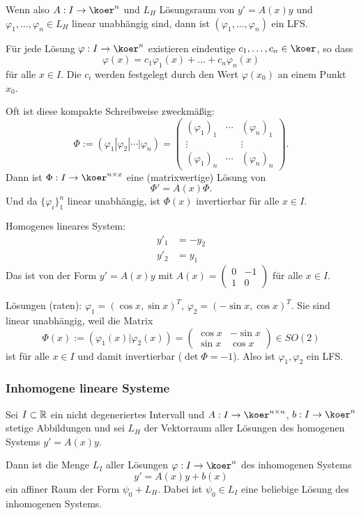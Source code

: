Wenn also $A:I \to \koer^n$ und $L_H$ Lösungsraum von $y' = A(x) y$ und
$\varphi_1, \ldots, \varphi_n \in L_H$ linear unabhängig sind, dann ist
$(\varphi_1, \ldots, \varphi_n)$ ein LFS.

Für jede Lösung $\varphi: I \to \koer^n$ existieren eindeutige $c_1, \ldots, c_n
\in \koer$, so dass
\[ \varphi(x) = c_1 \varphi_1(x) + \ldots + c_n \varphi_n(x) \]
für alle $x \in I$. Die $c_i$ werden festgelegt durch den Wert $\varphi(x_0)$ an
einem Punkt $x_0$.

Oft ist diese kompakte Schreibweise zweckmäßig:
\[ \Phi := ( \varphi_1 | \varphi_2 | \cdots | \varphi_n ) =
   \begin{pmatrix}
     (\varphi_1)_1 & \cdots & (\varphi_n)_1 \\
     \vdots & & \vdots \\
     (\varphi_1)_n & \cdots & (\varphi_n)_n
   \end{pmatrix}. \]
 Dann ist $\Phi:I \to \koer^{n \times x}$ eine (matrixwertige) Lösung von
 \[ \Phi' = A(x) \Phi. \]
 Und da $\{ \varphi_i \}_1^n$ linear unabhängig, ist $\Phi(x)$ invertierbar für
 alle $x \in I$.

 \begin{exmp}
   Homogenes lineares System:
   \[ \begin{aligned}
       y'_1 &= - y_2 \\
       y'_2 &= y_1
     \end{aligned} \]
   Das ist von der Form $y' = A(x) y$ mit $A(x) = \begin{pmatrix} 0 & -1 \\ 1 &
     0 \end{pmatrix}$ für alle $x \in I$.

   Lösungen (raten): $\varphi_1 = (\cos x, \sin x)^T$, $\varphi_2 = (- \sin x,
   \cos x)^T$. Sie sind linear unabhängig, weil die Matrix
   \[ \Phi(x) := (\varphi_1(x) | \varphi_2(x)) = \begin{pmatrix} \cos x & - \sin x \\ \sin x & \cos x
     \end{pmatrix} \in SO(2) \]
   ist für alle $x \in I$ und damit invertierbar ($\det \Phi = -1$). Also ist $\varphi_1, \varphi_2$ ein LFS.
 \end{exmp}

 \subsubsection{Inhomogene lineare Systeme}
 \begin{thm}
   Sei $I \subset \mathbb{R}$ ein nicht degeneriertes Intervall und $A: I \to
   \koer^{n \times n}$, $b: I \to \koer^n$ stetige Abbildungen und sei $L_H$ der
   Vektorraum aller Lösungen des homogenen Systems $y' = A(x) y$.

   Dann ist die Menge $L_I$ aller Lösungen $\varphi:I \to \koer^n$ des inhomogenen
   Systems
   \[ y' = A(x) y + b(x) \]
   ein affiner Raum der Form $\psi_0 + L_H$. Dabei ist $\psi_0 \in L_I$ eine
   beliebige Lösung des inhomogenen Systems.
 \end{thm}

